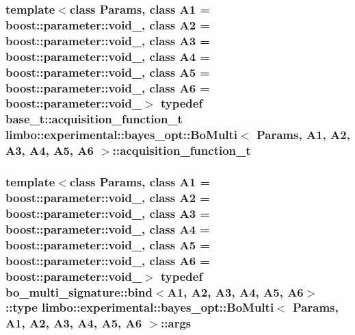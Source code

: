 \subsubsection[{acquisition\+\_\+function\+\_\+t}]{\setlength{\rightskip}{0pt plus 5cm}template$<$class Params, class A1 = boost\+::parameter\+::void\+\_\+, class A2 = boost\+::parameter\+::void\+\_\+, class A3 = boost\+::parameter\+::void\+\_\+, class A4 = boost\+::parameter\+::void\+\_\+, class A5 = boost\+::parameter\+::void\+\_\+, class A6 = boost\+::parameter\+::void\+\_\+$>$ typedef {\bf base\+\_\+t\+::acquisition\+\_\+function\+\_\+t} {\bf limbo\+::experimental\+::bayes\+\_\+opt\+::\+Bo\+Multi}$<$ Params, A1, A2, A3, A4, A5, A6 $>$\+::{\bf acquisition\+\_\+function\+\_\+t}}\label{classlimbo_1_1experimental_1_1bayes__opt_1_1_bo_multi_af5c8c4b0a4912c1efa5e0156a83b06ab}
\hypertarget{classlimbo_1_1experimental_1_1bayes__opt_1_1_bo_multi_afbec2602c4a22ad0a1285cc813a51c58}{}
\subsubsection[{args}]{\setlength{\rightskip}{0pt plus 5cm}template$<$class Params, class A1 = boost\+::parameter\+::void\+\_\+, class A2 = boost\+::parameter\+::void\+\_\+, class A3 = boost\+::parameter\+::void\+\_\+, class A4 = boost\+::parameter\+::void\+\_\+, class A5 = boost\+::parameter\+::void\+\_\+, class A6 = boost\+::parameter\+::void\+\_\+$>$ typedef bo\+\_\+multi\+\_\+signature\+::bind$<$A1, A2, A3, A4, A5, A6$>$\+::type {\bf limbo\+::experimental\+::bayes\+\_\+opt\+::\+Bo\+Multi}$<$ Params, A1, A2, A3, A4, A5, A6 $>$\+::{\bf args}}\label{classlimbo_1_1experimental_1_1bayes__opt_1_1_bo_multi_afbec2602c4a22ad0a1285cc813a51c58}
\hypertarget{classlimbo_1_1experimental_1_1bayes__opt_1_1_bo_multi_ab5e0a9d998083ff1063045d289683287}{}
